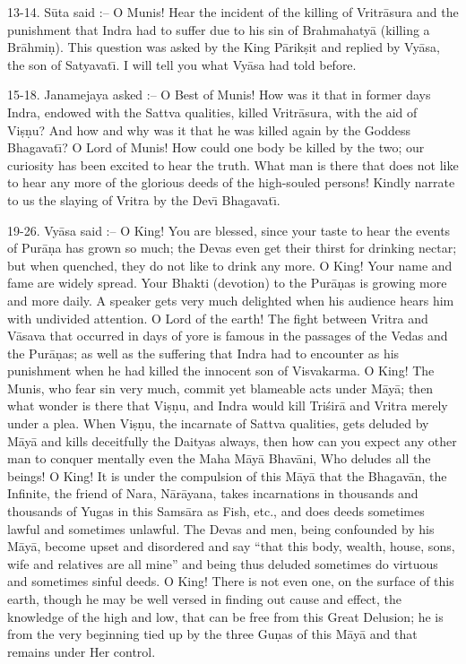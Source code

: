 13-14. S\=uta said :-- O Munis! Hear the incident of the killing of Vritr\=asura and the punishment that Indra had to suffer due to his sin of Brahmahaty\=a (killing a Br\=ahmi\d{n}). This question was asked by the King P\=arik\d{s}it and replied by Vy\=asa, the son of Satyavat\={\i}. I will tell you what Vy\=asa had told before.

15-18. Janamejaya asked :-- O Best of Munis! How was it that in former days Indra, endowed with the Sattva qualities, killed Vritr\=asura, with the aid of Vi\d{s}\d{n}u? And how and why was it that he was killed again by the Goddess Bhagavat\={\i}? O Lord of Munis! How could one body be killed by the two; our curiosity has been excited to hear the truth. What man is there that does not like to hear any more of the glorious deeds of the high-souled persons! Kindly narrate to us the slaying of Vritra by the Dev\={\i} Bhagavat\={\i}.

19-26. Vy\=asa said :-- O King! You are blessed, since your taste to hear the events of Pur\=a\d{n}a has grown so much; the Devas even get their thirst for drinking nectar; but when quenched, they do not like to drink any more. O King! Your name and fame are widely spread. Your Bhakti (devotion) to the Pur\=a\d{n}as is growing more and more daily. A speaker gets very much delighted when his audience hears him with undivided attention. O Lord of the earth! The fight between Vritra and V\=asava that occurred in days of yore is famous in the passages of the Vedas and the Pur\=a\d{n}as; as well as the suffering that Indra had to encounter as his punishment when he had killed the innocent son of Visvakarma. O King! The Munis, who fear sin very much, commit yet blameable acts under M\=ay\=a; then what wonder is there that Vi\d{s}\d{n}u, and Indra would kill Tri\'sir\=a and Vritra merely under a plea. When Vi\d{s}\d{n}u, the incarnate of Sattva qualities, gets deluded by M\=ay\=a and kills deceitfully the Daityas always, then how can you expect any other man to conquer mentally even the Maha M\=ay\=a Bhav\=ani, Who deludes all the beings! O King! It is under the compulsion of this M\=ay\=a that the Bhagav\=an, the Infinite, the friend of Nara, N\=ar\=ayana, takes incarnations in thousands and thousands of Yugas in this Sams\=ara as Fish, etc., and does deeds sometimes lawful and sometimes unlawful. The Devas and men, being confounded by his M\=ay\=a, become upset and disordered and say ``that this body, wealth, house, sons, wife and relatives are all mine'' and being thus deluded sometimes do virtuous and sometimes sinful deeds. O King! There is not even one, on the surface of this earth, though he may be well versed in finding out cause and effect, the knowledge of the high and low, that can be free from this Great Delusion; he is from the very beginning tied up by the three Gu\d{n}as of this M\=ay\=a and that remains under Her control.

